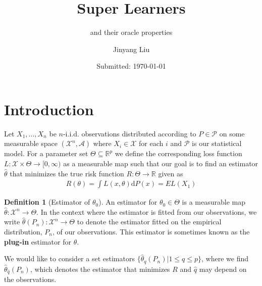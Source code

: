 \documentclass[11pt, a4paper]{article}
\author{Jinyang Liu}
\title{Super Learners}
\subtitle{and their oracle properties}
\date{Submitted: \today}
\theoremstyle{definition}
\newtheorem{definition}[theorem]{Definition}
\theoremstyle{remark}
\newtheorem{example}{Example}
\newcommand{\cl}{q}
\begin{document}
\begingroup
    \selectfont
    \maketitle
    \tableofcontents
    \newpage
\endgroup


\section{Introduction}
Let $ X_1, ..., X_n $ be $ n $-i.i.d. observations distributed according to $ P \in \mathcal{P} $ on some measurable space $ (\mathcal{X}^{n}, \mathcal{A}) $ where $ X_{i} \in \mathcal{X} $ for each $ i $ and $ \mathcal{P} $ is our statistical model. For a parameter set $ \Theta \subseteq \mathbb{R}^{p}$ we define the corresponding loss function $ L : \mathcal{X} \times \Theta \to [0, \infty) $ as a measurable map such that our goal is to find an estimator $ \hat{\theta}  $ that minimizes the true risk function $ R: \Theta \to \mathbb{R} $ given as
\begin{align*}
    R(\theta) = \int L(x, \theta)  \mathrm{d}P(x) = EL(X_1) 
\end{align*}
\begin{definition}[Estimator of $ \theta_0 $]
    An estimator for $ \theta_0 \in \Theta $ is a measurable map $ \hat{\theta} : \mathcal{X}^{n} \to \Theta  $. In the context where the estimator is fitted from our observations, we write $ \hat{\theta}(P_n) : \mathcal{X}^{n} \to \Theta $ to denote the estimator fitted on the empirical distribution, $ P_n $, of our observations. This estimator is sometimes known as the \textbf{plug-in} estimator for $ \theta $.  
\end{definition}

%

We would like to consider a set estimators $ \{ \hat{\theta}_{\cl}(P_n) | 1 \leq \cl \leq p \} $, where we find $ \hat{\theta}_{ \hat{\cl} }(P_n) $, which denotes the estimator that minimizes $ R $ and $ \hat{\cl}  $ may depend on the observations. 
\end{document}
